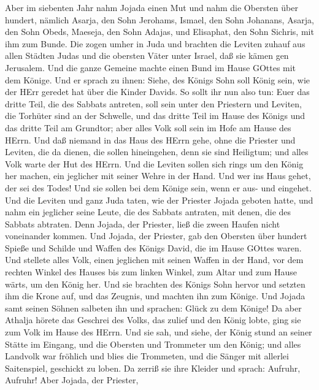  Aber im siebenten Jahr nahm Jojada einen Mut und nahm die
Obersten über hundert, nämlich Asarja, den Sohn Jerohams, Ismael, den
Sohn Johanans, Asarja, den Sohn Obeds, Maeseja, den Sohn Adajas, und
Elisaphat, den Sohn Sichris, mit ihm zum Bunde.  Die zogen
umher in Juda und brachten die Leviten zuhauf aus allen Städten Judas
und die obersten Väter unter Israel, daß sie kämen gen Jerusalem.
 Und die ganze Gemeine machte einen Bund im Hause GOttes mit
dem Könige. Und er sprach zu ihnen: Siehe, des Königs Sohn soll König
sein, wie der HErr geredet hat über die Kinder Davids.  So
sollt ihr nun also tun: Euer das dritte Teil, die des Sabbats antreten,
soll sein unter den Priestern und Leviten, die Torhüter sind an der
Schwelle,  und das dritte Teil im Hause des Königs und das
dritte Teil am Grundtor; aber alles Volk soll sein im Hofe am Hause des
HErrn.  Und daß niemand in das Haus des HErrn gehe, ohne die
Priester und Leviten, die da dienen, die sollen hineingehen, denn sie
sind Heiligtum; und alles Volk warte der Hut des HErrn.  Und
die Leviten sollen sich rings um den König her machen, ein jeglicher mit
seiner Wehre in der Hand. Und wer ins Haus gehet, der sei des Todes! Und
sie sollen bei dem Könige sein, wenn er aus- und eingehet. 
Und die Leviten und ganz Juda taten, wie der Priester Jojada geboten
hatte, und nahm ein jeglicher seine Leute, die des Sabbats antraten, mit
denen, die des Sabbats abtraten. Denn Jojada, der Priester, ließ die
zween Haufen nicht voneinander kommen.  Und Jojada, der
Priester, gab den Obersten über hundert Spieße und Schilde und Waffen
des Königs David, die im Hause GOttes waren.  Und stellete
alles Volk, einen jeglichen mit seinen Waffen in der Hand, vor dem
rechten Winkel des Hauses bis zum linken Winkel, zum Altar und zum Hause
wärts, um den König her.  Und sie brachten des Königs Sohn
hervor und setzten ihm die Krone auf, und das Zeugnis, und machten ihn
zum Könige. Und Jojada samt seinen Söhnen salbeten ihn und sprachen:
Glück zu dem Könige!  Da aber Athalja hörete das Geschrei
des Volks, das zulief und den König lobte, ging sie zum Volk im Hause
des HErrn.  Und sie sah, und siehe, der König stund an
seiner Stätte im Eingang, und die Obersten und Trommeter um den König;
und alles Landvolk war fröhlich und blies die Trommeten, und die Sänger
mit allerlei Saitenspiel, geschickt zu loben. Da zerriß sie ihre Kleider
und sprach: Aufruhr, Aufruhr!  Aber Jojada, der Priester,
